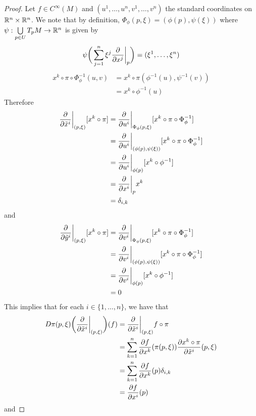\documentclass{book}
\begin{document}
	\begin{proof}
		Let $f \in C^{\infty}(M)$ and $(u^1, \ldots, u^n, v^1, \ldots, v^n)$ the standard coordinates on $\mathbb{R}^n \times \mathbb{R}^n$. We note that by definition, $\Phi_{\phi}(p, \xi) = (\phi(p), \psi(\xi))$ where $\psi: \bigcup\limits_{p \in U} T_pM \rightarrow \mathbb{R}^n$ is given by 
		$$\psi \bigg (\sum_{j=1}^n \xi^j \frac{\partial}{\partial x^j} \bigg|_p \bigg) = (\xi^1, \ldots, \xi^n)$$
		\begin{align*}
			x^k \circ \pi \circ \Phi_{\phi}^{-1}(u,v)
			& =  x^k \circ \pi (\phi^{-1}(u), \psi^{-1}(v)) \\
			& = x^k \circ \phi^{-1}(u) 
		\end{align*}	
		Therefore
		\begin{align*}
			\frac{\partial }{\partial \tilde{x}^i} \bigg|_{(p,\xi)} [x^k \circ \pi  ]
			& = \frac{\partial }{\partial u^i} \bigg|_{\Phi_{\phi}(p,\xi)}[ x^k \circ \pi \circ \Phi_{\phi}^{-1} ]\\
			& = \frac{\partial }{\partial u^i} \bigg|_{(\phi(p), \psi(\xi))} [x^k \circ \pi \circ \Phi_{\phi}^{-1}] \\
			& = \frac{\partial }{\partial u^i} \bigg|_{\phi(p)}  [x^k \circ \phi^{-1}] \\
			& =  \frac{\partial }{\partial x^i} \bigg|_{p} x^k \\
			& = \delta_{i,k}
		\end{align*}
		and 
		\begin{align*}
			\frac{\partial }{\partial \tilde{y}^i} \bigg|_{(p,\xi)} [x^k \circ \pi  ]
			& = \frac{\partial }{\partial v^i} \bigg|_{\Phi_{\phi}(p,\xi)}[ x^k \circ \pi \circ \Phi_{\phi}^{-1} ]\\
			& = \frac{\partial }{\partial v^i} \bigg|_{(\phi(p), \psi(\xi))} [x^k \circ \pi \circ \Phi_{\phi}^{-1}] \\
			& = \frac{\partial }{\partial v^i} \bigg|_{\phi(p)}  [x^k \circ \phi^{-1}] \\
			& = 0
		\end{align*}
		This implies that for each $i \in \{1, \ldots, n\}$, we have that 
		\begin{align*}
			D \pi (p, \xi) \bigg( \frac{\partial}{\partial \tilde{x}^i } \bigg|_{(p, \xi)} \bigg) (f)
			& = \frac{\partial}{\partial \tilde{x}^i} \bigg|_{(p, \xi)} f \circ \pi \\
			& = \sum_{k=1}^n \frac{\partial f }{\partial x^k}(\pi (p,\xi)) \frac{\partial x^k \circ \pi }{\partial \tilde{x}^i}(p,\xi) \\
			& = \sum_{k=1}^n \frac{\partial f }{\partial x^k}(p) \delta_{i,k} \\
			& = \frac{\partial f }{\partial x^i}(p) 
		\end{align*}
		and 

\end{proof}
\end{document}

